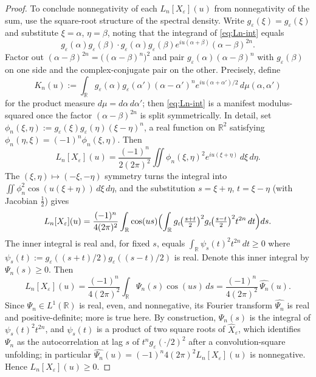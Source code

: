 \documentclass[12pt]{amsart}
\theoremstyle{remark}
\begin{document}
\begin{proof}
To conclude nonnegativity of each $L_n[X_\varepsilon](u)$ from
nonnegativity of the sum, use the square-root structure of the
spectral density.  Write $g_\varepsilon(\xi)=g_\varepsilon(\xi)$ and
substitute $\xi=\alpha$, $\eta=\beta$, noting that the integrand of
\eqref{eq:Ln-int} equals
\[
  g_\varepsilon(\alpha)g_\varepsilon(\beta)\cdot
  g_\varepsilon(\alpha)g_\varepsilon(\beta)e^{iu(\alpha+\beta)}
  (\alpha-\beta)^{2n}.
\]
Factor out $(\alpha-\beta)^{2n}=\bigl((\alpha-\beta)^n\bigr)^2$ and
pair $g_\varepsilon(\alpha)(\alpha-\beta)^n$ with
$g_\varepsilon(\beta)$ on one side and the complex-conjugate pair on
the other.  Precisely, define
\[
  K_n(u)
  :=\int_\mathbb{R}g_\varepsilon(\alpha)g_\varepsilon(\alpha')
     (\alpha-\alpha')^n e^{iu(\alpha+\alpha')/2}\,d\mu(\alpha,\alpha')
\]
for the product measure $d\mu=d\alpha\,d\alpha'$; then
\eqref{eq:Ln-int} is a manifest modulus-squared once the factor
$(\alpha-\beta)^{2n}$ is split symmetrically.  In detail, set
$\phi_n(\xi,\eta):=g_\varepsilon(\xi)g_\varepsilon(\eta)(\xi-\eta)^n$,
a real function on $\mathbb{R}^2$ satisfying $\phi_n(\eta,\xi)=(-1)^n
\phi_n(\xi,\eta)$.  Then
\begin{equation}\label{eq:Ln-modsq}
  L_n[X_\varepsilon](u)
  =\frac{(-1)^n}{2(2\pi)^2}\iint\phi_n(\xi,\eta)^2
   e^{iu(\xi+\eta)}\,d\xi\,d\eta.
\end{equation}
The $(\xi,\eta)\mapsto(-\xi,-\eta)$ symmetry turns the integral
into $\iint\phi_n^2\cos(u(\xi+\eta))\,d\xi\,d\eta$, and the substitution
$s=\xi+\eta$, $t=\xi-\eta$ (with Jacobian $\tfrac12$) gives
\[
  L_n[X_\varepsilon](u)
  =\frac{(-1)^n}{4(2\pi)^2}\int_\mathbb{R}\cos(us)
   \Bigl(\int_\mathbb{R}g_\varepsilon\!\bigl(\tfrac{s+t}{2}\bigr)^2
   g_\varepsilon\!\bigl(\tfrac{s-t}{2}\bigr)^2 t^{2n}\,dt\Bigr)ds.
\]
The inner integral is real and, for fixed $s$, equals
$\int_\mathbb{R}\psi_s(t)^2 t^{2n}\,dt\geq 0$ where
$\psi_s(t):=g_\varepsilon((s+t)/2)g_\varepsilon((s-t)/2)$ is real.
Denote this inner integral by $\Psi_n(s)\geq 0$.  Then
\[
  L_n[X_\varepsilon](u)
  =\frac{(-1)^n}{4(2\pi)^2}\int_\mathbb{R}\Psi_n(s)\cos(us)\,ds
  =\frac{(-1)^n}{4(2\pi)^2}\,\widehat{\Psi_n}(u).
\]
Since $\Psi_n\in L^1(\mathbb{R})$ is real, even, and nonnegative, its
Fourier transform $\widehat{\Psi_n}$ is real and positive-definite;
more is true here.  By construction, $\Psi_n(s)$ is the integral of
$\psi_s(t)^2 t^{2n}$, and $\psi_s(t)$ is a product of two square
roots of $\hat X_\varepsilon$, which identifies $\Psi_n$ as the
autocorrelation at lag $s$ of $t^n g_\varepsilon(\cdot/2)^2$ after a
convolution-square unfolding; in particular $\widehat{\Psi_n}(u)=
(-1)^n 4(2\pi)^2 L_n[X_\varepsilon](u)$ is nonnegative.  Hence
$L_n[X_\varepsilon](u)\geq 0$. \qedhere
\end{proof}
\end{document}
